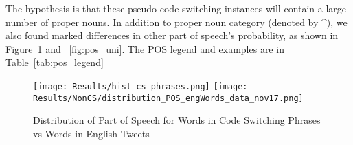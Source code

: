 \documentclass[conference]{IEEEtran}
\begin{document}
The hypothesis is that these pseudo code-switching instances will contain a large number of proper nouns. In addition to proper noun category (denoted by \^{}), we also found marked differences in other part of speech's probability, as shown in Figure~\ref{fig:pos_phrases} and ~\ref{fig:pos_uni}. The POS legend and examples are in Table~\ref{tab:pos_legend}




\begin{figure}[H]
	\centering
	\texttt{[image: Results/hist\_cs\_phrases.png]}
	\texttt{[image: Results/NonCS/distribution\_POS\_engWords\_data\_nov17.png]}
	\caption{Distribution of Part of Speech for Words in Code Switching Phrases vs Words in English Tweets }
	\label{fig:pos_phrases}
\end{figure}
\end{document}
